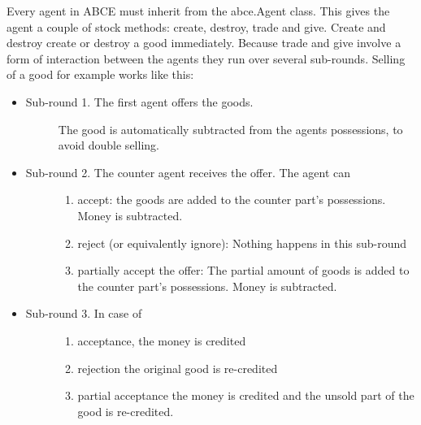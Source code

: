 \documentclass[letterpaper,10pt,english]{sphinxmanual}
\begin{document}
Every agent in ABCE must inherit from the abce.Agent class. This gives the
agent a couple of stock methods: create, destroy, trade and give. Create and
destroy create or destroy a good immediately. Because trade and give involve
a form of interaction between the agents they run over several sub-rounds.
Selling of a good for example works like this:
\begin{itemize}
\item {} \begin{description}
\item[{Sub-round 1. The first agent offers the goods.}] \leavevmode
The good is automatically subtracted from the agents possessions, to avoid double selling.

\end{description}

\item {} \begin{description}
\item[{Sub-round 2. The counter agent receives the offer. The agent can}] \leavevmode\begin{enumerate}
\item {} 
accept:
the goods are added to the counter part's possessions. Money is subtracted.

\item {} 
reject (or equivalently ignore):
Nothing happens in this sub-round

\item {} 
partially accept the offer:
The partial amount of goods is added to the counter part's possessions. Money is subtracted.

\end{enumerate}

\end{description}

\item {} \begin{description}
\item[{Sub-round 3. In case of}] \leavevmode\begin{enumerate}
\item {} 
acceptance, the money is credited

\item {} 
rejection the original good is re-credited

\item {} 
partial acceptance the money is credited and
the unsold part of the good is re-credited.

\end{enumerate}

\end{description}

\end{itemize}
\end{document}
